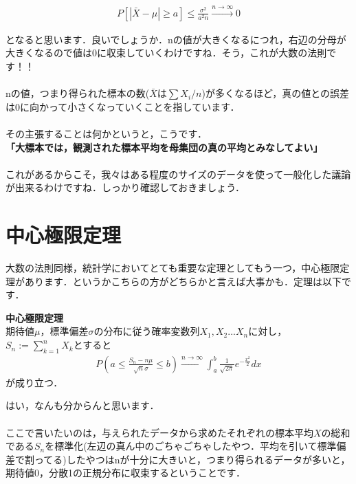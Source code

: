 \documentclass[11pt,a4paper,uplatex]{ujreport} 	%
\begin{document}
\begin{align}
  P[|\bar{X}-\mu|\geq a] \leq \frac{\sigma^2}{a^2n}　\xrightarrow{n\rightarrow\infty}0
\end{align}

となると思います．良いでしょうか．nの値が大きくなるにつれ，右辺の分母が大きくなるので値は0に収束していくわけですね．そう，これが大数の法則です！！\\
\\

nの値，つまり得られた標本の数($\bar{X}は\sum X_i/n$)が多くなるほど，真の値との誤差は0に向かって小さくなっていくことを指しています．\\\\

その主張することは何かというと，こうです．\\

\textbf{「大標本では，観測された標本平均を母集団の真の平均とみなしてよい」}\\
\\

これがあるからこそ，我々はある程度のサイズのデータを使って一般化した議論が出来るわけですね．しっかり確認しておきましょう．


\section{中心極限定理}
大数の法則同様，統計学においてとても重要な定理としてもう一つ，中心極限定理があります．というかこちらの方がどちらかと言えば大事かも．定理は以下です．\\

\begin{screen}
  \textbf{中心極限定理}\\
  期待値$\mu$，標準偏差$\sigma$の分布に従う確率変数列$X_1,X_2...X_n$に対し，$S_n := \sum_{k=1}^n X_k$とすると
  \begin{align}
    P(a \leq \frac{S_n -n\mu}{\sqrt{n}\sigma} \leq b) \xrightarrow{n\rightarrow\infty} \int_a^b \frac{1}{\sqrt{2\pi}}e^{-\frac{x^2}{2}}dx
  \end{align}
  が成り立つ．
\end{screen}

はい，なんも分からんと思います．\\
\\

ここで言いたいのは，与えられたデータから求めたそれぞれの標本平均$X$の総和である$S_n$を標準化(左辺の真ん中のごちゃごちゃしたやつ．平均を引いて標準偏差で割ってる)したやつはnが十分に大きいと，つまり得られるデータが多いと，期待値0，分散1の正規分布に収束するということです．\\
\end{document}
